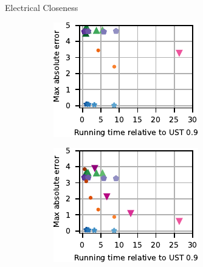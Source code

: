 \documentclass[10pt,titlepage,english,presentation]{beamer}
\begin{document}
\begin{frame}[t]{Electrical Closeness}
\begin{figure}
\begin{subfigure}[t]{.33\textwidth}
\centering
\includegraphics[width=.9\textwidth]{../sources/plots/el-clos/abs-errors.pdf}
\end{subfigure}\hfill
\begin{subfigure}[t]{.33\textwidth}
\centering
\includegraphics[width=.9\textwidth]{../sources/plots/el-clos/avg-abs-errors.pdf}
\end{subfigure}\hfill
\begin{subfigure}[t]{.33\textwidth}
\centering

\end{subfigure}
\end{figure}
\end{frame}
\end{document}
